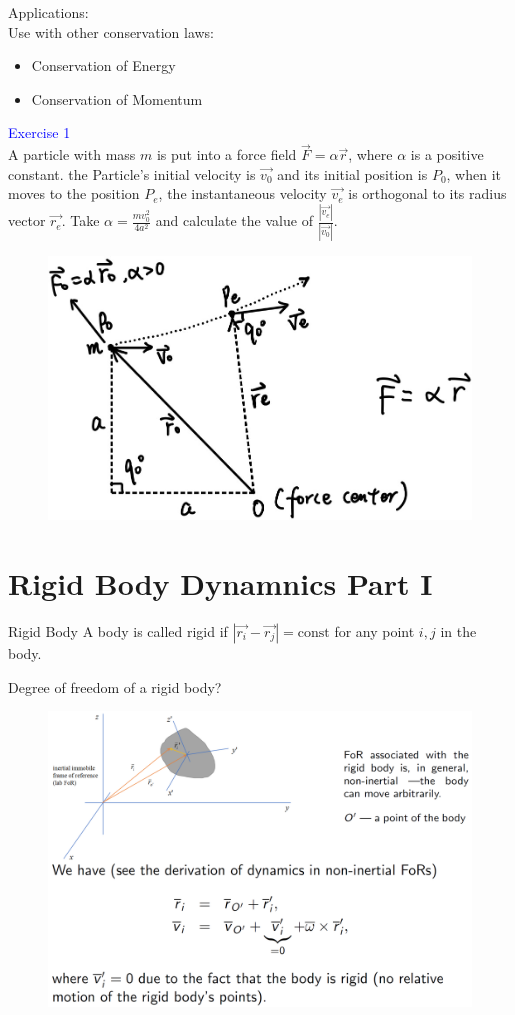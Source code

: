 \documentclass{beamer}
\begin{document}
\begin{frame}
Applications:\\
Use with other conservation laws:
\begin{itemize}
  \item Conservation of Energy
  \item Conservation of Momentum
\end{itemize}\pause
\textcolor{blue}{Exercise 1}\\
A particle with mass $m$ is put into a force field $\vec{F} = \alpha \vec{r}$, where $\alpha$ is a positive constant. the Particle's initial velocity is $\vec{v_0}$ and its initial position is $P_0$, when it moves to the position $P_e$, the instantaneous velocity $\vec{v_e}$ is orthogonal to its radius vector $\vec{r_e}$. Take $\alpha = \frac{mv_{0}^2}{4a^2}$ and calculate the value of $\frac{|\vec{v_e}|}{|\vec{v_0}|}$.
\begin{figure}[htbp]
\centering
\includegraphics[width=0.4 \linewidth, angle =0]{ex1.png}
\label{fig:3}
\end{figure}
\end{frame}

\section{Rigid Body Dynamnics Part I}
\begin{frame}
  \begin{block}{Rigid Body}
    A body is called rigid if $|\vec{r_i}-\vec{r_j}| = \text{const}$ for any point $i, j$ in the body.
  \end{block}\pause
  Degree of freedom of a rigid body?\pause
  \begin{figure}[htbp]
  \centering
  \includegraphics[width=0.7 \linewidth, angle =0]{rigid.png}
  \label{fig:4}
  \end{figure} 
\end{frame}
\end{document}
